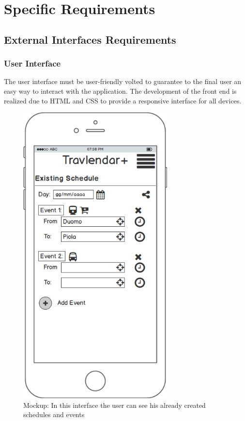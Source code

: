 \documentclass[numbers=noenddot, 12pt, a4paper, oneside]{scrbook}
\begin{document}
\chapter{Specific Requirements}

\section{External Interfaces Requirements}
\subsection*{User Interface}

The user interface must be user-friendly volted to guarantee to the final user an easy way to interact with the application. The development of the front end is realized due to HTML and CSS to provide a responsive interface for all devices.\\

\begin{figure}[H]
	\centering
	\includegraphics[width=0.7\textwidth]{mockups/ExistingSchedule}
	\caption{Mockup: In this interface the user can see his already created schedules and events }
\end{figure}
\end{document}
